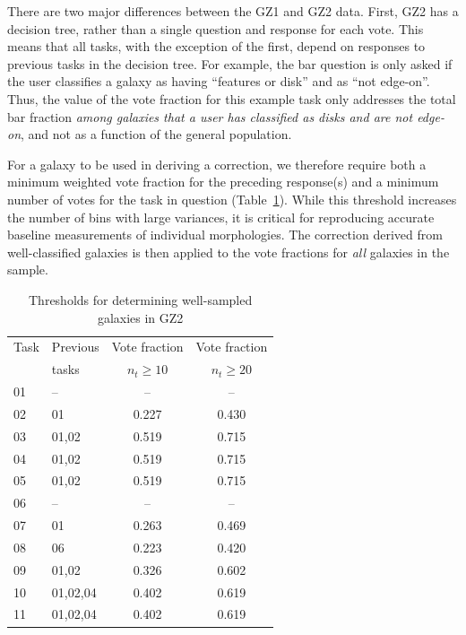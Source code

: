 \documentclass[useAMS,usenatbib]{mn2e}
\begin{document}
There are two major differences between the GZ1 and GZ2 data. First, GZ2 has a decision tree, rather than a single question and response for each vote. This means that all tasks, with the exception of the first, depend on responses to previous tasks in the decision tree. For example, the bar question is only asked if the user classifies a galaxy as having ``features or disk'' and as ``not edge-on''. Thus, the value of the vote fraction for this example task only addresses the total bar fraction {\em among galaxies that a user has classified as disks and are not edge-on}, and not as a function of the general population. 

For a galaxy to be used in deriving a correction, we therefore require both a minimum weighted vote fraction for the preceding response(s) and a minimum number of votes for the task in question (Table~\ref{tbl-thresholds}). While this threshold increases the number of bins with large variances, it is critical for reproducing accurate baseline measurements of individual morphologies. The correction derived from well-classified galaxies is then applied to the vote fractions for {\em all} galaxies in the sample. 

\begin{table}
\centering
 \begin{tabular}{@{}llcc}
 \hline
\multicolumn{1}{l}{Task} &
\multicolumn{1}{l}{Previous} &
\multicolumn{1}{c}{Vote fraction} &
\multicolumn{1}{c}{Vote fraction}
\\ 
\multicolumn{1}{l}{} &
\multicolumn{1}{l}{tasks} &
\multicolumn{1}{c}{$n_{t}\geq10$} &
\multicolumn{1}{c}{$n_{t}\geq20$}
\\ 
\hline					
01                      & --        & --        & --        \\
02                      & 01        & 0.227     & 0.430     \\
03                      & 01,02     & 0.519     & 0.715     \\
04                      & 01,02     & 0.519     & 0.715     \\
05                      & 01,02     & 0.519     & 0.715     \\
06                      & --        & --        & --        \\
07                      & 01        & 0.263     & 0.469     \\
08                      & 06        & 0.223     & 0.420     \\
09                      & 01,02     & 0.326     & 0.602     \\
10                      & 01,02,04  & 0.402     & 0.619     \\
11                      & 01,02,04  & 0.402     & 0.619     \\
\hline
 \end{tabular}
 \caption{Thresholds for determining well-sampled galaxies in GZ2 \label{tbl-thresholds}}
\end{table}
\end{document}
